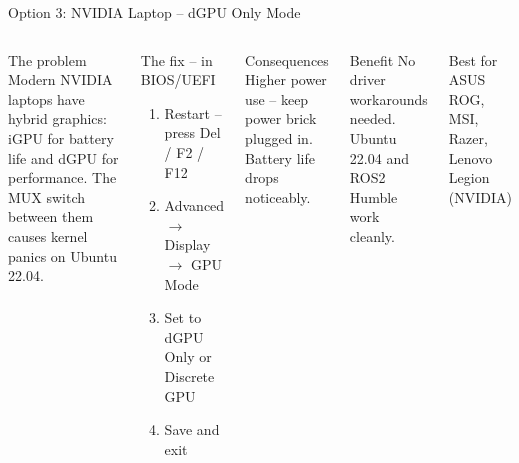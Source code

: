 \documentclass[aspectratio=169]{beamer}
\begin{document}
\begin{frame}{Option 3: NVIDIA Laptop -- dGPU Only Mode}
  \begin{columns}
      \begin{block}{The problem}
        Modern NVIDIA laptops have \alert{hybrid graphics}:
        iGPU for battery life and dGPU for performance.
        The MUX switch between them causes kernel panics
        on Ubuntu 22.04.
      \end{block}
      \vspace{0.4em}
      \begin{exampleblock}{The fix -- in BIOS/UEFI}
        \begin{enumerate}
          \item Restart -- press Del / F2 / F12
          \item Advanced $\rightarrow$ Display $\rightarrow$ GPU Mode
          \item Set to \alert{dGPU Only} or Discrete GPU
          \item Save and exit
        \end{enumerate}
      \end{exampleblock}
      \begin{alertblock}{Consequences}
        Higher power use -- keep power brick plugged in.
        Battery life drops noticeably.
      \end{alertblock}
      \vspace{0.4em}
      \begin{block}{Benefit}
        No driver workarounds needed.
        Ubuntu 22.04 and ROS2 Humble work cleanly.
      \end{block}
      \vspace{0.4em}
      \begin{exampleblock}{Best for}
        ASUS ROG, MSI, Razer, Lenovo Legion (NVIDIA)
      \end{exampleblock}
  \end{columns}
\end{frame}
\end{document}
